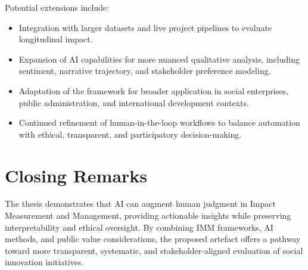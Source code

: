 Potential extensions include:

\begin{itemize}
    \item Integration with larger datasets and live project pipelines to evaluate longitudinal impact.
    \item Expansion of AI capabilities for more nuanced qualitative analysis, including sentiment, narrative trajectory, and stakeholder preference modeling.
    \item Adaptation of the framework for broader application in social enterprises, public administration, and international development contexts.
    \item Continued refinement of human-in-the-loop workflows to balance automation with ethical, transparent, and participatory decision-making.
\end{itemize}

\section{Closing Remarks}\label{sec:closing-remarks}

The thesis demonstrates that AI can augment human judgment in Impact Measurement and Management, providing actionable insights while preserving interpretability and ethical oversight. 
By combining IMM frameworks, AI methods, and public value considerations, the proposed artefact offers a pathway toward more transparent, systematic, and stakeholder-aligned evaluation of social innovation initiatives.